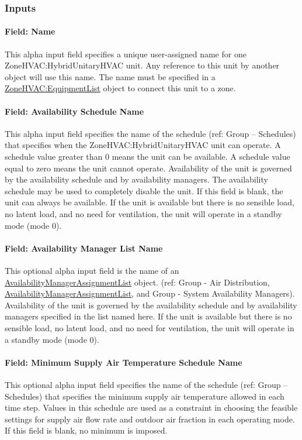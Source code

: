 \subsubsection{Inputs}

\paragraph{Field: Name}

This alpha input field specifies a unique user-assigned name for one ZoneHVAC:HybridUnitaryHVAC unit. Any reference to this unit by another object will use this name. The name must be specified in a \hyperref[zonehvacequipmentlist]{ZoneHVAC:EquipmentList} object to connect this unit to a zone.

\paragraph{Field: Availability Schedule Name}
This alpha input field specifies the name of the schedule (ref: Group – Schedules) that specifies when the ZoneHVAC:HybridUnitaryHVAC unit can operate. A schedule value greater than 0 means the unit can be available. A schedule value equal to zero means the unit cannot operate. Availability of the unit is governed by the availability schedule and by availability managers. The availability schedule may be used to completely disable the unit.  If this field is blank, the unit can always be available. If the unit is available but there is no sensible load, no latent load, and no need for ventilation, the unit will operate in a standby mode (mode 0).

\paragraph{Field: Availability Manager List Name}
This optional alpha input field is the name of an \hyperref[availabilitymanagerassignmentlist]{AvailabilityManagerAssignmentList} object.
(ref: Group - Air Distribution, \hyperref[availabilitymanagerassignmentlist]{AvailabilityManagerAssignmentList}, and Group - System Availability Managers). Availability of the unit is governed by the availability schedule and by availability managers specified in the list named here. If the unit is available but there is no sensible load, no latent load, and no need for ventilation, the unit will operate in a standby mode (mode 0).

\paragraph{Field: Minimum Supply Air Temperature Schedule Name}
This optional alpha input field specifies the name of the schedule (ref: Group – Schedules) that specifies the minimum supply air temperature allowed in each time step. Values in this schedule are used as a constraint in choosing the feasible settings for supply air flow rate and outdoor air fraction in each operating mode. If this field is blank, no minimum is imposed.

